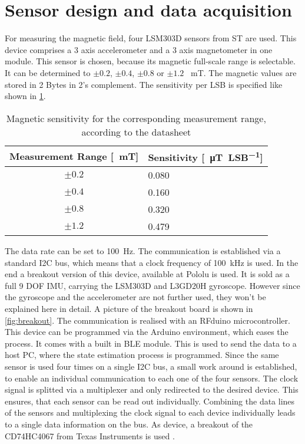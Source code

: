 \section{Sensor design and data acquisition} \label{cha:sensors}

For measuring the magnetic field, four LSM303D sensors \cite{STlsm2012} from ST are used. This device comprises a 3 axis accelerometer and a 3 axis magnetometer in one module. This sensor is chosen, because its magnetic full-scale range is selectable. It can be determined to $ \pm 0.2$, $ \pm 0.4 $, $ \pm 0.8 $ or $ \pm 1.2 $ \SI{}{\milli\tesla}. The magnetic values are stored in 2 Bytes in 2's complement. The sensitivity per \ac{LSB} is specified like shown in \ref{tab:magSensitivity}.

\begin{table}[h]
\centering
\begin{tabular}{|c|l|}
\hline
\textbf{Measurement Range [\SI{}{\milli\tesla}]} & \textbf{Sensitivity [\SI{}{\micro\tesla \per LSB}]} \\ \hline
$ \pm 0.2 $ & 0.080 \\ \hline
$ \pm 0.4 $ & 0.160 \\ \hline
$ \pm 0.8 $ & 0.320 \\ \hline
$ \pm 1.2 $ & 0.479 \\ \hline
\end{tabular}
\caption{Magnetic sensitivity for the corresponding measurement range, according to the datasheet}
\label{tab:magSensitivity}
\end{table}

The data rate can be set to \SI{100}{\Hz}. The communication is established via a standard I2C bus, which means that a clock frequency of \SI{100}{\kilo \Hz} is used. In the end a breakout version of this device, available at Pololu \cite{pol2016} is used. It is sold as a full 9 \ac{DOF} IMU, carrying the LSM303D and L3GD20H gyroscope. However since the gyroscope and the accelerometer are not further used, they won't be explained here in detail. A picture of the breakout board is shown in \ref{fig:breakout}. The communication is realised with an RFduino microcontroller. This device can be programmed via the Arduino environment, which eases the process. It comes with a built in \ac{BLE} module. This is used to send the data to a host PC, where the state estimation process is programmed. Since the same sensor is used four times on a single I2C bus, a small work around is established, to enable an individual communication to each one of the four sensors. The clock signal is splitted via a multiplexer and only redirected to the desired device. This ensures, that each sensor can be read out individually. Combining the data lines of the sensors and multiplexing the clock signal to each device individually leads to a single data information on the bus. As device, a breakout of the CD74HC4067 from Texas Instruments is used \cite{TImux2003}.

